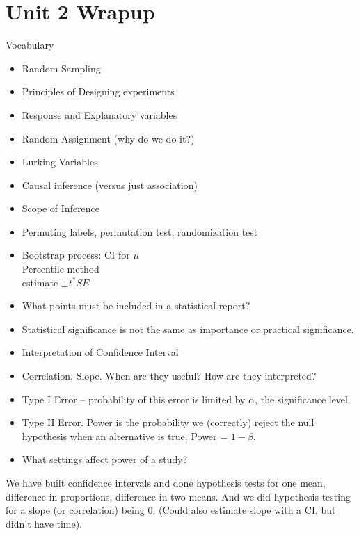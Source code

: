 \def\theTopic{Unit 2 Wrapup }
\def\dayNum{20 }

\section{ Unit 2 Wrapup}

Vocabulary


\begin{itemize}
  \item  Random Sampling
  \item Principles of Designing experiments
  \item  Response and Explanatory variables
  \item  Random Assignment (why do we do it?)
  \item  Lurking Variables
  \item  Causal inference (versus just association)
  \item  Scope of Inference
  \item  Permuting labels, permutation test, randomization test
  \item  Bootstrap process: CI for $\mu$\\
         Percentile method\\
         estimate $\pm t^* SE$
  \item  What points must be included in a statistical report?
  \item  Statistical significance is not the same as importance or practical
    significance.
  \item Interpretation of Confidence Interval
  \item Correlation, Slope. When are they useful? How are they interpreted?
  \item  Type I Error  – probability of this error is limited by
    $\alpha$, the significance level.
  \item  Type II Error.   Power is the probability we (correctly)
    reject the null hypothesis when an alternative is true. Power =  $1-\beta$.
  \item  What settings affect power of a study?
  \end{itemize}
  
  We have built confidence intervals and done hypothesis tests for one
  mean, difference in proportions, difference in two means. And we did
  hypothesis testing for a slope (or correlation) being 0. (Could also
  estimate slope with a CI, but didn't have time).

